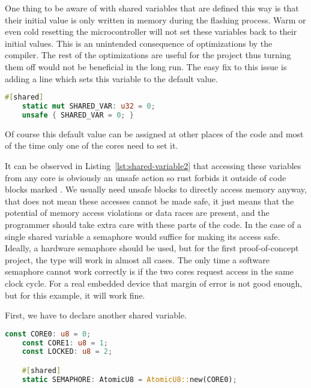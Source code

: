 One thing to be aware of with shared variables that are defined this way is that their initial value is only written in memory during the flashing process. Warm or even cold resetting the microcontroller will not set these variables back to their initial values. This is an unintended consequence of optimizations by the compiler. The rest of the optimizations are useful for the project thus turning them off would not be beneficial in the long run. The easy fix to this issue is adding a line which sets this variable to the default value.

\begin{lstlisting}[language=Rust,frame=single,float=!ht,style=customrust,label={lst:shared-variable2},caption={Shared Variable Example With Default Value}]
    #[shared]
    static mut SHARED_VAR: u32 = 0;
    unsafe { SHARED_VAR = 0; }
\end{lstlisting}

Of course this default value can be assigned at other places of the code and most of the time only one of the cores need to set it.

It can be observed in Listing~\ref{lst:shared-variable2} that accessing these variables from any core is obviously an unsafe action so rust forbids it outside of code blocks marked . We usually need unsafe blocks to directly access memory anyway, that does not mean these accesses cannot be made safe, it just means that the potential of memory access violations or data races are present, and the programmer should take extra care with these parts of the code. In the case of a single shared variable a semaphore would suffice for making its access safe. Ideally, a hardware semaphore should be used, but for the first proof-of-concept project, the  type will work in almost all cases. The only time a software semaphore cannot work correctly is if the two cores request access in the same clock cycle. For a real embedded device that margin of error is not good enough, but for this example, it will work fine.

First, we have to declare another shared variable.

\begin{lstlisting}[language=Rust,frame=single,float=!ht,style=customrust,label={lst:sw-semaphore1},caption={Software Semaphore Variables}]
    const CORE0: u8 = 0;
    const CORE1: u8 = 1;
    const LOCKED: u8 = 2;

    #[shared]
    static SEMAPHORE: AtomicU8 = AtomicU8::new(CORE0);
\end{lstlisting}

